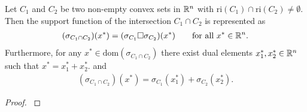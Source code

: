 \begin{ftheorem}
  Let $C_1$ and $C_2$ be two non-empty convex sets in $\mathbb{R}^n$ with
  $\mathrm{ri}(C_1)\cap\mathrm{ri}(C_2)\neq\emptyset.$
  Then the support function of the intersection 
  $
    C_1 \cap C_2
  $
  is represented as
  \begin{gather}
    (\sigma_{
    C_1 \cap C_2
    })
    (x^*)
    =
    (\sigma_{C_1}\square \sigma_{C_2})
    (x^*)
    \qquad
    \text{for all}\ 
    x^* \in \R^n.
  \end{gather}
  Furthermore, for any
  $
  x^*\in \mathrm{dom}
    (\sigma_{
    C_1 \cap C_2
    })
  $
  there exist dual elements 
  $
    x_1^*
    ,
    x_2^*
    \in \mathbb{R}^n
  $ 
  such that 
  $
    x^*
    =
    x_1^*
    +
    x_2^*.
  $
  and
  \begin{gather}
    (\sigma_{
    C_1 \cap C_2
    })
    (x^*)
    =
    \sigma_{C_1}(x_1^*)
    +
    \sigma_{C_2}(x_2^*).
  \end{gather}
\end{ftheorem}
\begin{proof}
  \emph{\cite[Theorem~4.23]{Mordukhovich2022}}
\end{proof}
